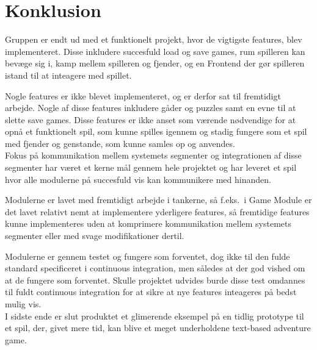 \section{Konklusion}
Gruppen er endt ud med et funktionelt projekt, hvor de vigtigste features, blev implementeret.
Disse inkludere succesfuld load og save games, rum spilleren kan bevæge sig i, kamp mellem spilleren
og fjender, og en Frontend der gør spilleren istand til at inteagere med spillet.

Nogle features er ikke blevet implementeret, og er derfor sat til fremtidigt arbejde.
Nogle af disse features inkludere gåder og puzzles samt en evne til at slette save games.
Disse features er ikke anset som værende nødvendige for at opnå et funktionelt spil, som kunne spilles
igennem og stadig fungere som et spil med fjender og genstande, som kunne samles op og anvendes.\\

\noindent Fokus på kommunikation mellem systemets segmenter og integrationen af disse segmenter har været
et kerne mål gennem hele projektet og har leveret et spil hvor alle modulerne på succesfuld vis kan 
kommunikere med hinanden. 

Modulerne er lavet med fremtidigt arbejde i tankerne, så f.eks.\ i Game Module er det lavet relativt nemt 
at implementere yderligere features, så fremtidige features kunne implementeres uden at komprimere 
kommunikation mellem systemets segmenter eller med svage modifikationer dertil.

Modulerne er gennem testet og fungere som forventet, dog ikke til den fulde standard specificeret i 
continuous integration, men således at der god vished om at de fungere som forventet. Skulle projektet
udvides burde disse test omdannes til fuldt continuous integration for at sikre at nye features
inteageres på bedst mulig vis.\\

I sidste ende er slut produktet et glimerende eksempel på en tidlig prototype til et spil, der, givet mere
tid, kan blive et meget underholdene text-based adventure game.

\newpage
